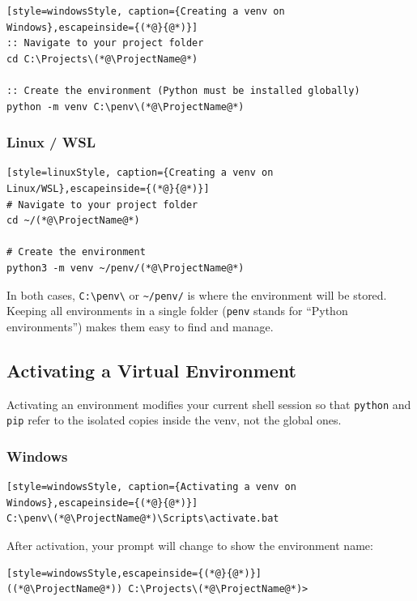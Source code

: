 \begin{lstlisting}[style=windowsStyle, caption={Creating a venv on Windows},escapeinside={(*@}{@*)}]
:: Navigate to your project folder
cd C:\Projects\(*@\ProjectName@*)

:: Create the environment (Python must be installed globally)
python -m venv C:\penv\(*@\ProjectName@*)
\end{lstlisting}

\subsubsection{Linux / WSL}

\begin{lstlisting}[style=linuxStyle, caption={Creating a venv on Linux/WSL},escapeinside={(*@}{@*)}]
# Navigate to your project folder
cd ~/(*@\ProjectName@*)

# Create the environment
python3 -m venv ~/penv/(*@\ProjectName@*)
\end{lstlisting}

In both cases, \texttt{C:\textbackslash penv\textbackslash \ProjectName{}} or
\texttt{\textasciitilde/penv/\ProjectName{}} is where the environment will be stored.
Keeping all environments in a single folder (\texttt{penv} stands for
``Python environments'') makes them easy to find and manage.

\subsection{Activating a Virtual Environment}

Activating an environment modifies your current shell session so that
\texttt{python} and \texttt{pip} refer to the isolated copies inside the
venv, not the global ones.

\subsubsection{Windows}

\begin{lstlisting}[style=windowsStyle, caption={Activating a venv on Windows},escapeinside={(*@}{@*)}]
C:\penv\(*@\ProjectName@*)\Scripts\activate.bat
\end{lstlisting}

After activation, your prompt will change to show the environment name:
\begin{lstlisting}[style=windowsStyle,escapeinside={(*@}{@*)}]
((*@\ProjectName@*)) C:\Projects\(*@\ProjectName@*)>
\end{lstlisting}

